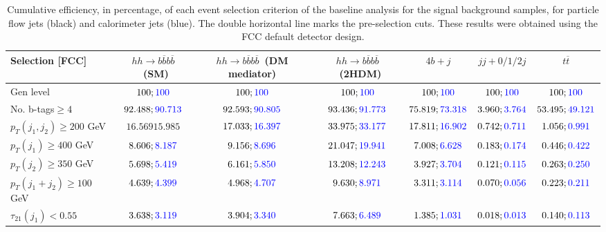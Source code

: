 \begin{landscape}
		\begin{table}
			\centering
			\caption{Cumulative efficiency, in percentage, of each event selection criterion of the baseline analysis for the signal background samples, for particle flow jets (black) and calorimeter jets (blue). The double horizontal line marks the pre-selection cuts. These results were obtained using the FCC default detector design.}
			\begin{tabular}{lcccccc}
				\toprule 
				\textbf{Selection [FCC]} & $hh\rightarrow b\overline{b}b\overline{b}$~(SM) & $hh\rightarrow b\overline{b}b\overline{b}$~(DM mediator) & $hh\rightarrow b\overline{b}b\overline{b}$~(2HDM) & $4b+j$  & $jj+0/1/2 j$ & $t\overline{t}$ \\
				\midrule
				Gen level & $100;\textcolor{blue}{100}$ & $100;\textcolor{blue}{100}$ &$100;\textcolor{blue}{100}$& $100;\textcolor{blue}{100}$& $100;\textcolor{blue}{100}$& $100;\textcolor{blue}{100}$ \\
				\rowcolor{black!7}No. b-tags$\geq 4$&$92.488;\textcolor{blue}{90.713}$&$92.593;\textcolor{blue}{90.805}$&$93.436;\textcolor{blue}{91.773}$&$75.819;\textcolor{blue}{73.318}$&$3.960;\textcolor{blue}{3.764}$&$53.495;\textcolor{blue}{49.121}$\\
				$p_T(j_1,j_2)\geq200$ GeV & $16.569{15.985}$ & $17.033;\textcolor{blue}{16.397}$&$33.975;\textcolor{blue}{33.177}$ &$17.811;\textcolor{blue}{16.902}$&$0.742;\textcolor{blue}{0.711}$&$1.056;\textcolor{blue}{0.991}$\\
				\midrule \midrule
				\rowcolor{black!7}$p_T(j_1)\geq 400$ GeV & $8.606;\textcolor{blue}{8.187}$ &$9.156;\textcolor{blue}{8.696}$  &$21.047;\textcolor{blue}{19.941}$&$7.008;\textcolor{blue}{6.628}$&$0.183;\textcolor{blue}{0.174}$&$0.446;\textcolor{blue}{0.422}$\\ 
				$p_T(j_2)\geq 350$ GeV & $5.698;\textcolor{blue}{5.419}$& $6.161;\textcolor{blue}{5.850}$&$13.208;\textcolor{blue}{12.243}$&$3.927;\textcolor{blue}{3.704}$&$0.121;\textcolor{blue}{0.115}$&$0.263;\textcolor{blue}{0.250}$\\
				\rowcolor{black!7}$p_T(j_1+j_2)\geq 100$ GeV &$4.639;\textcolor{blue}{4.399}$ & $4.968;\textcolor{blue}{4.707}$ &$9.630;\textcolor{blue}{8.971}$&$3.311;\textcolor{blue}{3.114}$&$0.070;\textcolor{blue}{0.056}$&$0.223;\textcolor{blue}{0.211}$\\
				$\tau_{21}(j_1)<0.55$ & $3.638;\textcolor{blue}{3.119}$& $3.904;\textcolor{blue}{3.340}$&$7.663;\textcolor{blue}{6.489}$&$1.385;\textcolor{blue}{1.031}$&$0.018;\textcolor{blue}{0.013}$&$0.140;\textcolor{blue}{0.113}$\\

\end{tabular}
\end{table}
\end{landscape}
